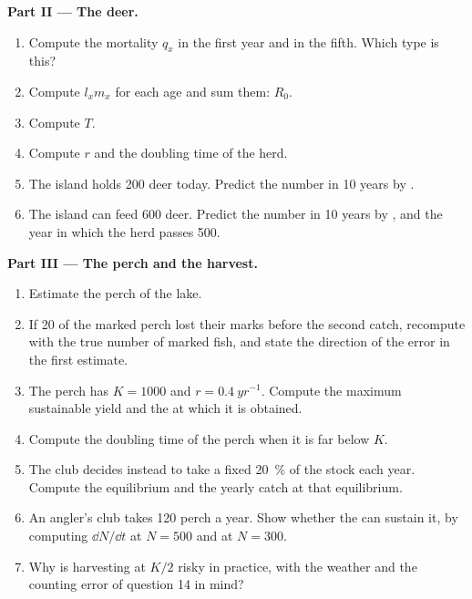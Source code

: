 \begin{problem}
\medskip
\noindent\textbf{Part II --- The deer.}
\begin{enumerate}[resume]
  \item Compute the mortality $q_x$ in the first year and in the fifth.
        Which  type is this?
  \item Compute $l_x m_x$ for each age and sum them: $R_0$.
  \item Compute $T$.
  \item Compute $r$ and the doubling time of the herd.
  \item The island holds 200 deer today. Predict the number in 10
        years by .
  \item The island can feed 600 deer. Predict the number in 10 years by
        , and the year in which the herd passes 500.
\end{enumerate}

\medskip
\noindent\textbf{Part III --- The perch and the harvest.}
\begin{enumerate}[resume]
  \item Estimate the perch  of the lake.
  \item If 20 of the marked perch lost their marks before the second
        catch, recompute with the true number of marked fish, and
        state the direction of the error in the first estimate.
  \item The perch  has $K = 1000$ and $r = \qty{0.4}{yr^{-1}}$.
        Compute the maximum sustainable yield and the  at
        which it is obtained.
  \item Compute the doubling time of the perch  when it is
        far below $K$.
  \item The club decides instead to take a fixed \qty{20}{\%} of the
        stock each year. Compute the equilibrium  and the
        yearly catch at that equilibrium.
  \item An angler's club takes 120 perch a year. Show whether the
         can sustain it, by computing $\dd N/\dd t$ at $N =
        500$ and at $N = 300$.
  \item Why is harvesting at $K/2$ risky in practice, with the
        weather and the counting error of question 14 in mind?
\end{enumerate}


\end{problem}
